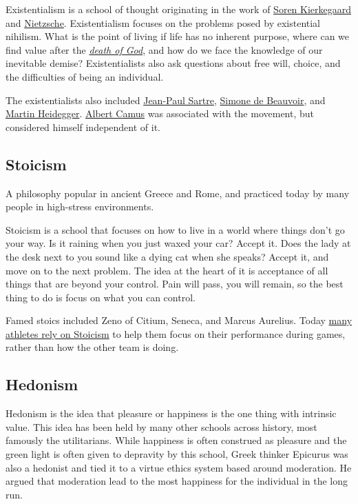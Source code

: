 \documentclass[../my_knowledge.tex]{subfiles}
\begin{document}
Existentialism is a school of thought originating in the work of \href{https://www.youtube.com/watch?v=D9JCwkx558o}{Soren Kierkegaard} and \href{https://www.youtube.com/watch?v=wHWbZmg2hzU}{Nietzsche}. Existentialism focuses on the problems posed by existential nihilism. What is the point of living if life has no inherent purpose, where can we find value after the \href{https://bigthink.com/thinking/what-nietzsche-really-meant-by-god-is-dead/}{\textit{death of God}}, and how do we face the knowledge of our inevitable demise? Existentialists also ask questions about free will, choice, and the difficulties of being an individual.

The existentialists also included \href{https://www.youtube.com/watch?v=3bQsZxDQgzU}{Jean-Paul Sartre}, \href{https://bigthink.com/the-present/ten-women-of-philosophy-and-why-you-should-know-them/}{Simone de Beauvoir}, and \href{https://www.youtube.com/watch?v=Br1sGrA7XTU&t=2s}{Martin Heidegger}. \href{https://www.youtube.com/watch?v=jQOfbObFOCw}{Albert Camus} was associated with the movement, but considered himself independent of it.

\subsection{Stoicism}
A philosophy popular in ancient Greece and Rome, and practiced today by many people in high-stress environments.

Stoicism is a school that focuses on how to live in a world where things don’t go your way. Is it raining when you just waxed your car? Accept it. Does the lady at the desk next to you sound like a dying cat when she speaks? Accept it, and move on to the next problem. The idea at the heart of it is acceptance of all things that are beyond your control. Pain will pass, you will remain, so the best thing to do is focus on what you can control.

Famed stoics included Zeno of Citium, Seneca, and Marcus Aurelius. Today \href{https://www.si.com/nfl/2015/12/08/ryan-holiday-nfl-stoicism-book-pete-carroll-bill-belichick}{many athletes rely on Stoicism} to help them focus on their performance during games, rather than how the other team is doing.

\subsection{Hedonism}
Hedonism is the idea that pleasure or happiness is the one thing with intrinsic value. This idea has been held by many other schools across history, most famously the utilitarians. While happiness is often construed as pleasure and the green light is often given to depravity by this school, Greek thinker Epicurus was also a hedonist and tied it to a virtue ethics system based around moderation. He argued that moderation lead to the most happiness for the individual in the long run.
\end{document}
